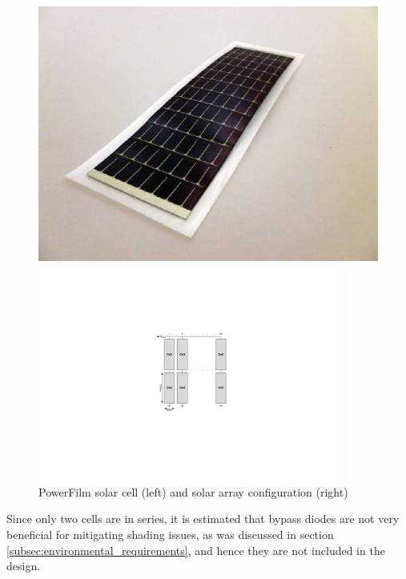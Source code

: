 \begin{figure}[H]
\centering
\begin{minipage}[c]{0.4\linewidth}
\centering
\includegraphics[width=\textwidth]{figures/SolarCell_RC7-2_Powerfilm}
\end{minipage}
\hspace{5mm}
\begin{minipage}[c]{0.55\linewidth}
\centering
\includegraphics[width=0.9\textwidth]{figures/fig_CDR_Solar_Array}
\end{minipage}
\caption[PowerFilm solar cell and solar array configuration]{PowerFilm solar cell (left) and solar array configuration (right)}
\label{fig:solar_cell}
\end{figure}
%
\noindent
Since only two cells are in series, it is estimated that bypass diodes are not very beneficial for mitigating shading issues, as was discussed in section \ref{subsec:environmental_requirements}, and hence they are not included in the design.
%
